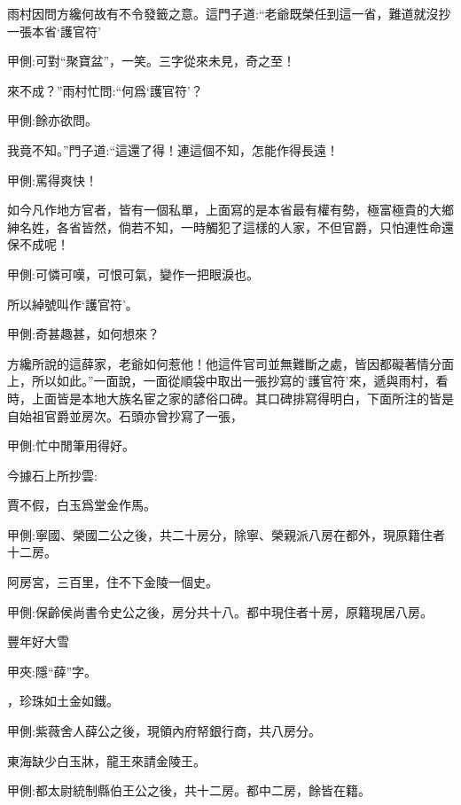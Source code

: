 \begin{parag}
    雨村因問方纔何故有不令發籤之意。這門子道:“老爺既榮任到這一省，難道就沒抄一張本省‘護官符’\begin{note}甲側:可對“聚寶盆”，一笑。三字從來未見，奇之至！\end{note}來不成？”雨村忙問:“何爲‘護官符’？\begin{note}甲側:餘亦欲問。\end{note}我竟不知。”門子道:“這還了得！連這個不知，怎能作得長遠！\begin{note}甲側:罵得爽快！\end{note}如今凡作地方官者，皆有一個私單，上面寫的是本省最有權有勢，極富極貴的大鄉紳名姓，各省皆然，倘若不知，一時觸犯了這樣的人家，不但官爵，只怕連性命還保不成呢！\begin{note}甲側:可憐可嘆，可恨可氣，變作一把眼淚也。\end{note}所以綽號叫作‘護官符’。\begin{note}甲側:奇甚趣甚，如何想來？\end{note}方纔所說的這薛家，老爺如何惹他！他這件官司並無難斷之處，皆因都礙著情分面上，所以如此。”一面說，一面從順袋中取出一張抄寫的‘護官符’來，遞與雨村，看時，上面皆是本地大族名宦之家的諺俗口碑。其口碑排寫得明白，下面所注的皆是自始祖官爵並房次。石頭亦曾抄寫了一張，\begin{note}甲側:忙中閒筆用得好。\end{note}今據石上所抄雲:
\end{parag}


\begin{poem}
    \begin{pl}賈不假，白玉爲堂金作馬。\end{pl}
    \begin{note}甲側:寧國、榮國二公之後，共二十房分，除寧、榮親派八房在都外，現原籍住者十二房。\end{note}

    \begin{pl}阿房宮，三百里，住不下金陵一個史。\end{pl}
    \begin{note}甲側:保齡侯尚書令史公之後，房分共十八。都中現住者十房，原籍現居八房。\end{note}

    \begin{pl}豐年好大雪\end{pl}\begin{note}甲夾:隱“薛”字。\end{note} \begin{pl}，珍珠如土金如鐵。\end{pl}

    \begin{note}甲側:紫薇舍人薛公之後，現領內府帑銀行商，共八房分。\end{note}

    \begin{pl}東海缺少白玉牀，龍王來請金陵王。\end{pl}\begin{note}甲側:都太尉統制縣伯王公之後，共十二房。都中二房，餘皆在籍。\end{note}

\end{poem}


